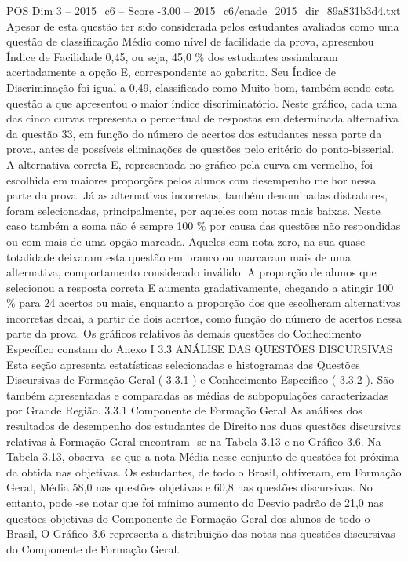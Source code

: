 \begin{textsample}{POS Dim 3 – 2015\_c6 – Score -3.00 – 2015\_c6/enade\_2015\_dir\_89a831b3d4.txt}
Apesar de esta questão ter sido considerada pelos estudantes avaliados como uma questão de classificação Médio como nível de facilidade da prova, apresentou Índice de Facilidade 0,45, ou seja, 45,0 \% dos estudantes assinalaram acertadamente a opção E, correspondente ao gabarito.
Seu Índice de Discriminação foi igual a 0,49, classificado como Muito bom, também sendo esta questão a que apresentou o maior índice discriminatório.
Neste gráfico, cada uma das cinco curvas representa o percentual de respostas em determinada alternativa da questão 33, em função do número de acertos dos estudantes nessa parte da prova, antes de possíveis eliminações de questões pelo critério do ponto-bisserial.
A alternativa correta E, representada no gráfico pela curva em vermelho, foi escolhida em maiores proporções pelos alunos com desempenho melhor nessa parte da prova.
Já as alternativas incorretas, também denominadas distratores, foram selecionadas, principalmente, por aqueles com notas mais baixas.
Neste caso também a soma não é sempre 100 \% por causa das questões não respondidas ou com mais de uma opção marcada.
Aqueles com nota zero, na sua quase totalidade deixaram esta questão em branco ou marcaram mais de uma alternativa, comportamento considerado inválido.
A proporção de alunos que selecionou a resposta correta E aumenta gradativamente, chegando a atingir 100 \% para 24 acertos ou mais, enquanto a proporção dos que escolheram alternativas incorretas decai, a partir de dois acertos, como função do número de acertos nessa parte da prova.
Os gráficos relativos às demais questões do Conhecimento Específico constam do Anexo I 3.3 ANÁLISE DAS QUESTÕES DISCURSIVAS Esta seção apresenta estatísticas selecionadas e histogramas das Questões Discursivas de Formação Geral ( 3.3.1 ) e Conhecimento Específico ( 3.3.2 ).
São também apresentadas e comparadas as médias de subpopulações caracterizadas por Grande Região. 3.3.1 Componente de Formação Geral As análises dos resultados de desempenho dos estudantes de Direito nas duas questões discursivas relativas à Formação Geral encontram -se na Tabela 3.13 e no Gráfico 3.6.
Na Tabela 3.13, observa -se que a nota Média nesse conjunto de questões foi próxima da obtida nas objetivas.
Os estudantes, de todo o Brasil, obtiveram, em Formação Geral, Média 58,0 nas questões objetivas e 60,8 nas questões discursivas.
No entanto, pode -se notar que foi mínimo aumento do Desvio padrão de 21,0 nas questões objetivas do Componente de Formação Geral dos alunos de todo o Brasil, O Gráfico 3.6 representa a distribuição das notas nas questões discursivas do Componente de Formação Geral.

\end{textsample}
